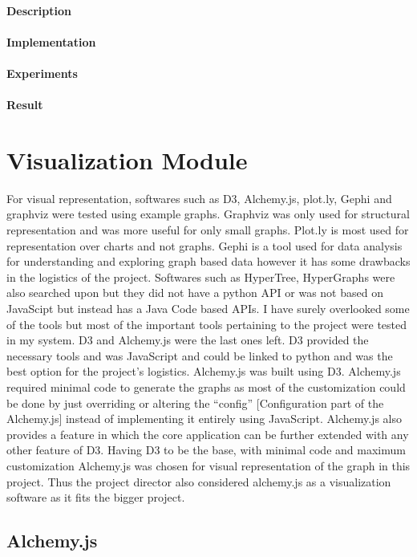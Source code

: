 \subsubsection{Description}
\subsubsection{Implementation}
\subsubsection{Experiments}
\subsubsection{Result}

\chapter{Visualization Module}
For visual representation, softwares such as D3, Alchemy.js, plot.ly, Gephi and graphviz were tested
using example graphs. Graphviz was only used for structural representation and was more useful for
only small graphs. Plot.ly is most used for representation over charts and not graphs. Gephi is a tool
used for data analysis for understanding and exploring graph based data however it has some
drawbacks in the logistics of the project. Softwares such as HyperTree, HyperGraphs were also
searched upon but they did not have a python API or was not based on JavaScipt but instead has a
Java Code based APIs. I have surely overlooked some of the tools but most of the important tools
pertaining to the project were tested in my system. D3 and Alchemy.js were the last ones left. D3
provided the necessary tools and was JavaScript and could be linked to python and was the best
option for the project's logistics. Alchemy.js was built using D3. Alchemy.js required minimal code
to generate the graphs as most of the customization could be done by just overriding or altering the
“config” [Configuration part of the Alchemy.js] instead of implementing it entirely using
JavaScript. Alchemy.js also provides a feature in which the core application can be further extended
with any other feature of D3. Having D3 to be the base, with minimal code and maximum
customization Alchemy.js was chosen for visual representation of the graph in this project. Thus the project director also considered alchemy.js as a visualization software as it fits the bigger project. 


\section{Alchemy.js}

